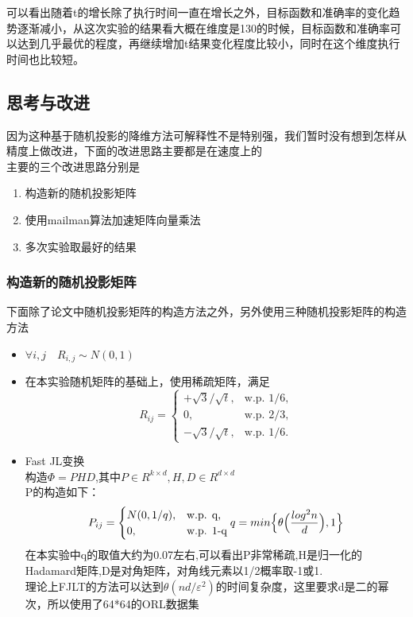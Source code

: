 \documentclass{ctexart}
\begin{document}
    可以看出随着t的增长除了执行时间一直在增长之外，目标函数和准确率的变化趋势逐渐减小，从这次实验的结果看大概在维度是130的时候，目标函数和准确率可以达到几乎最优的程度，再继续增加t结果变化程度比较小，同时在这个维度执行时间也比较短。

    \subsection{思考与改进}
    因为这种基于随机投影的降维方法可解释性不是特别强，我们暂时没有想到怎样从精度上做改进，下面的改进思路主要都是在速度上的\\
    主要的三个改进思路分别是
    \begin{enumerate}
    \item 构造新的随机投影矩阵
    \item 使用mailman算法加速矩阵向量乘法
    \item 多次实验取最好的结果
    \end{enumerate}

    \subsubsection{构造新的随机投影矩阵}
    下面除了论文中随机投影矩阵的构造方法之外，另外使用三种随机投影矩阵的构造方法\cite{alelyani2018feature}
    \begin{itemize}
    \item $\forall i,j \quad R_{i,j} \sim N(0,1)$
    \item 在本实验随机矩阵的基础上，使用稀疏矩阵，满足
    \begin{equation*}
    R_{ij} = \begin{cases} +\sqrt{3}/\sqrt{t},& \mbox{w.p. 1/6,} \\0, & \mbox{w.p. 2/3,} \\ -\sqrt{3}/\sqrt{t}, & \mbox{w.p. 1/6.}\end{cases}
    \end{equation*}
    \item Fast JL变换\\
    构造$\Phi = PHD$,其中$P \in R^{k \times d}, H,D \in R^{d \times d}$\\
    P的构造如下：
    \begin{equation*}
    P_{ij} = \begin{cases} N(0,1/q),& \mbox{w.p. q,} \\0, & \mbox{w.p. 1-q}\end{cases}\\
    q = min\Bigl\{ \theta \Bigl(\frac{log^2 n}{d}\Bigr),1 \Bigr\}
    \end{equation*}
    在本实验中q的取值大约为0.07左右,可以看出P非常稀疏,H是归一化的Hadamard矩阵,D是对角矩阵，对角线元素以1/2概率取-1或1.\\
    理论上FJLT的方法可以达到$\theta(nd/\varepsilon^2)$的时间复杂度，这里要求d是二的幂次，所以使用了64*64的ORL数据集
    \end{itemize}
\end{document}

